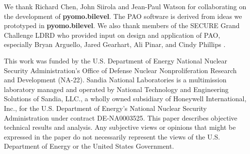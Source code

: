 We thank Richard Chen, John Siirola and Jean-Paul Watson for collaborating
on the development of \textbf{pyomo.bilevel}.  The PAO software is
derived from ideas we prototyped in \textbf{pyomo.bilevel}.  We also
thank members of the SECURE Grand Challenge LDRD who provided input on
design and application of PAO, especially Bryan Arguello, Jared Gearhart,
Ali Pinar, and Cindy Phillips .

This work was funded by the U.S. Department of Energy National Nuclear
Security Administration's Office of Defense Nuclear Nonproliferation
Research and Development (NA-22). Sandia National Laboratories is a
multimission laboratory managed and operated by National Technology
and Engineering Solutions of Sandia, LLC., a wholly owned subsidiary
of Honeywell International, Inc., for the U.S. Department of Energy's
National Nuclear Security Administration under contract DE-NA0003525.
This paper describes objective technical results and analysis.
Any subjective views or opinions that might be expressed in the paper
do not necessarily represent the views of the U.S. Department of Energy
or the United States Government.
